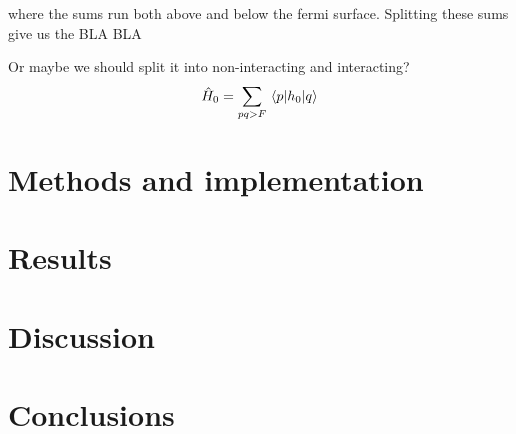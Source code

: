 \documentclass[10pt]{article}
\begin{document}
\begin{multicols}{2}
where the sums run both above and below the fermi surface. Splitting these
sums give us the  BLA BLA


Or maybe we should split it into  non-interacting and interacting?
\begin{equation}
    \hat H_0 = 
    \sum_{pq > F}\mel{p}{h_0}{q} 
\end{equation}

\section{Methods and implementation}
\label{sec:methods}
\section{Results}
\label{sec:results}

\section{Discussion}
\label{sec:discussion}


\section{Conclusions}





\end{multicols}
\end{document}
